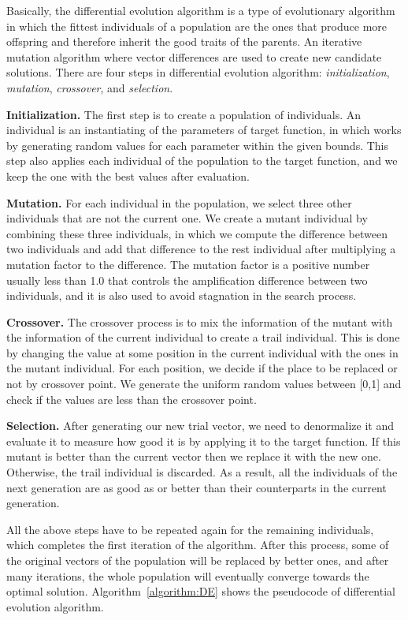 Basically, the differential evolution algorithm is a type of evolutionary algorithm~\cite{back1996evolutionary} in which the fittest individuals of a population are the ones that produce more offspring and therefore inherit the good traits of the parents. An iterative mutation algorithm where vector differences are used to create new candidate solutions. There are four steps in  differential evolution algorithm: \textit{initialization}, \textit{mutation}, \textit{crossover}, and \textit{selection}. 

\textbf{Initialization.} The first step is to create a population of individuals. An individual is an instantiating of the parameters of target function, in which works by generating random values for each parameter within the given bounds. This step also applies each individual of the population to the target function, and we keep the one with the best values after evaluation.

\textbf{Mutation.} For each individual in the population, we select three other individuals that are not the current one. We create a mutant individual by combining these three individuals, in which we compute the difference between two individuals and add that difference to the rest individual after multiplying a mutation factor to the difference. The mutation factor is a positive number usually less than 1.0 that controls the amplification difference between two individuals, and it is also used to avoid stagnation in the search process.

\textbf{Crossover.} The crossover process is to mix the information of the mutant with the information of the current individual to create a trail individual. This is done by changing the value at some position in the current individual with the ones in the mutant individual. For each position, we decide if the place to be replaced or not by crossover point. We generate the uniform random values between [0,1] and check if the values are less than the crossover point.

\textbf{Selection.} After generating our new trial vector, we need to denormalize it and evaluate it to measure how good it is by applying it to the target function. If this mutant is better than the current vector then we replace it with the new one. Otherwise, the trail individual is discarded. As a result, all the individuals of the next generation are as good as or better than their counterparts in the current generation.

All the above steps have to be repeated again for the remaining individuals, which completes the first iteration of the algorithm. After this process, some of the original vectors of the population will be replaced by better ones, and after many iterations, the whole population will eventually converge towards the optimal solution. Algorithm~\ref{algorithm:DE} shows the pseudocode of differential evolution algorithm.

